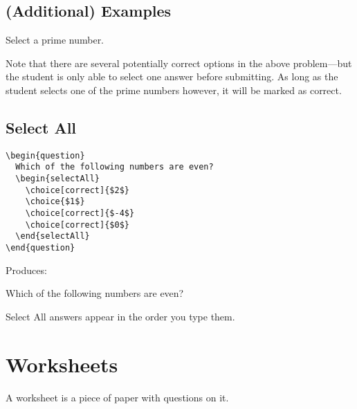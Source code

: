 \documentclass{ximera}
\begin{document}
\subsection{(Additional) Examples}

\begin{problem}
Select a prime number.
\begin{multipleChoice}
\end{multipleChoice}
\end{problem}

Note that there are several potentially correct options in the above
problem---but the student is only able to select one answer before submitting.
As long as the student selects one of the prime numbers however, it will be
marked as correct.

\subsection{Select All}

  \begin{verbatim}
\begin{question}
  Which of the following numbers are even?
  \begin{selectAll}
    \choice[correct]{$2$}
    \choice{$1$}
    \choice[correct]{$-4$}
    \choice[correct]{$0$}
  \end{selectAll}
\end{question}
\end{verbatim}

Produces:

\begin{question}
  Which of the following numbers are even?
  \begin{selectAll}
  \end{selectAll}
\end{question}

\begin{remark}
  Select All answers appear in the order you type them.
\end{remark}

\section{Worksheets}

A worksheet is a piece of paper with questions on it.
\end{document}
